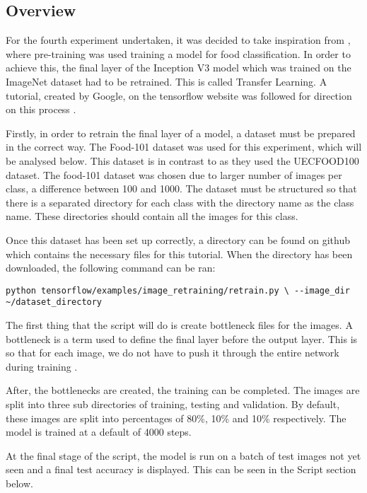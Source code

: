 \subsection*{Overview}
For the fourth experiment undertaken, it was decided to take inspiration from
\parencite{yanaiFood}, where pre-training was used training a model for food
classification. In order to achieve this, the final layer of the
Inception V3 model which was trained on the ImageNet dataset had to be retrained. This is called
Transfer Learning. A tutorial, created by Google, on the tensorflow website was followed
for direction on this process \parencite{retrainInception}.

Firstly, in order to retrain the final layer of a model, a dataset must be
prepared in the correct way. The Food-101 dataset \parencite{food101}
was used for this experiment, which will be analysed below.
This dataset is in contrast to \parencite{yanaiFood} as they used the UECFOOD100 dataset.
The food-101 dataset was chosen due to larger number of images per class, a difference between 100 and 1000.
The dataset must be structured so that
there is a separated directory for each class with the directory name as the class
name. These directories should contain all the images for this class. 

Once this dataset has been set up correctly, a directory can be found on github
which contains the necessary files for this tutorial. When the directory has
been downloaded, the following command can be ran:
\begin{lstlisting}
python tensorflow/examples/image_retraining/retrain.py \ --image_dir
~/dataset_directory
\end{lstlisting}

The first thing that the script will do is create bottleneck files for the
images. A bottleneck is a term used to define the final layer before the output
layer. This is so that for each image, we do not have to push it through the
entire network during training \parencite{retrainInception}.

After, the bottlenecks are created, the training can be completed. The images
are split into three sub directories of training, testing and validation. By
default, these images are split into percentages of 80\%, 10\% and 10\%
respectively. The model is trained at a default of 4000 steps. 

At the final stage of the script, the model is run on a batch of test images not
yet seen and a final test accuracy is displayed. This can be seen in the Script
section below.

